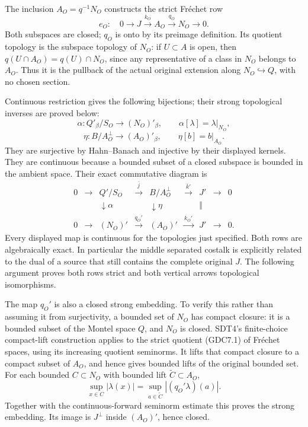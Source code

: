 The inclusion \(A_O=q^{-1}N_O\) constructs the strict Fréchet row \[
e_O:\quad0\to J\xrightarrow{k_O}A_O\xrightarrow{q_O}N_O\to0.
\tag{GDC7.1}
\] Both subspaces are closed; \(q_O\) is onto by its preimage
definition. Its quotient topology is the subspace topology of \(N_O\):
if \(U\subset A\) is open, then \(q(U\cap A_O)=q(U)\cap N_O\), since any
representative of a class in \(N_O\) belongs to \(A_O\). Thus it is the
pullback of the actual original extension along
\(N_O\hookrightarrow Q\), with no chosen section.

Continuous restriction gives the following bijections; their strong
topological inverses are proved below: \[
\alpha:Q'_\beta/S_O\longrightarrow (N_O)'_\beta,
\qquad \alpha[\lambda]=\lambda|_{N_O},
\] \[
\eta:B/A_O^\perp\longrightarrow (A_O)'_\beta,
\qquad\eta[b]=b|_{A_O}.
\tag{GDC7.2}
\] They are surjective by Hahn--Banach and injective by their displayed
kernels. They are continuous because a bounded subset of a closed
subspace is bounded in the ambient space. Their exact commutative
diagram is \[
\begin{array}{ccccccccc}
0&\to&Q'/S_O&\xrightarrow{\bar j}&B/A_O^\perp&\xrightarrow{\bar k'}&J'&\to&0\\
&&\downarrow\alpha&&\downarrow\eta&&\Vert\\
0&\to&(N_O)'&\xrightarrow{q_O'}&(A_O)'&\xrightarrow{k_O'}&J'&\to&0.
\end{array}
\tag{GDC7.3}
\] Every displayed map is continuous for the topologies just specified.
Both rows are algebraically exact. In particular the middle separated
costalk is explicitly related to the dual of a source that still
contains the complete original \(J\). The following argument proves both
rows strict and both vertical arrows topological isomorphisms.

The map \(q_O'\) is also a closed strong embedding. To verify this
rather than assuming it from surjectivity, a bounded set of \(N_O\) has
compact closure: it is a bounded subset of the Montel space \(Q\), and
\(N_O\) is closed. SDT4's finite-choice compact-lift construction
applies to the strict quotient (GDC7.1) of Fréchet spaces, using its
increasing quotient seminorms. It lifts that compact closure to a
compact subset of \(A_O\), and hence gives bounded lifts of the original
bounded set. For each bounded \(C\subset N_O\) with bounded lift
\(\widetilde C\subset A_O\), \[
\sup_{x\in C}|\lambda(x)|
=\sup_{a\in\widetilde C}|(q_O'\lambda)(a)|.
\tag{GDC7.4}
\] Together with the continuous-forward seminorm estimate this proves
the strong embedding. Its image is \(J^\perp\) inside \((A_O)'\), hence
closed.

